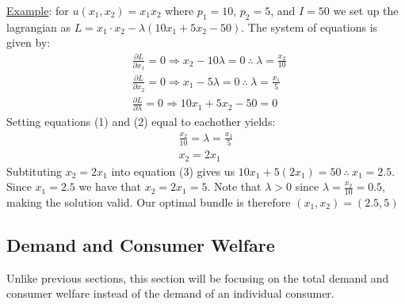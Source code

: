 \documentclass{article}
\begin{document}
  \par
  \underline{Example}: for $u(x_{1},x_{2}) = x_{1}x_{2}$ where $p_{1} = 10$, $p_{2} = 5$, and $I = 50$ we set up the lagrangian as $L = x_{1}\cdot x_{2} - \lambda(10x_{1} + 5x_{2} - 50)$. The system of equations is given by:
  \begin{align*}
    &\frac{\partial L}{\partial x_{1}} = 0 \Rightarrow x_{2} - 10\lambda = 0 \ \therefore \ \lambda = \frac{x_{2}}{10} \ \tag{1} \\
    &\frac{\partial L}{\partial x_{2}} = 0 \Rightarrow x_{1} - 5\lambda = 0 \ \therefore \ \lambda = \frac{x_{1}}{5} \ \tag{2} \\
    &\frac{\partial L}{\partial \lambda} = 0 \Rightarrow 10x_{1} + 5x_{2} - 50 = 0 \ \tag{3}
  \end{align*}
  Setting equations (1) and (2) equal to eachother yields:
  \begin{gather*}
    \frac{x_{2}}{10} = \lambda = \frac{x_{1}}{5} \\
    x_{2} = 2x_{1}
  \end{gather*}
  Subtituting $x_{2} = 2x_{1}$ into equation (3) gives us $10x_{1} + 5(2x_{1}) = 50 \ \therefore \ x_{1} = 2.5$. Since $x_{1} = 2.5$ we have that $x_{2} = 2x_{1} = 5$. Note that $\lambda > 0$ since $\lambda = \tfrac{x_{2}}{10} = 0.5$, making the solution valid. Our optimal bundle is therefore $(x_{1}, x_{2}) = (2.5, 5)$

\newpage

\vspace{2.5mm}
\subsection{Demand and Consumer Welfare}
Unlike previous sections, this section will be focusing on the total demand and consumer welfare instead of the demand of an individual consumer. \par
\vspace{6mm}
\end{document}
